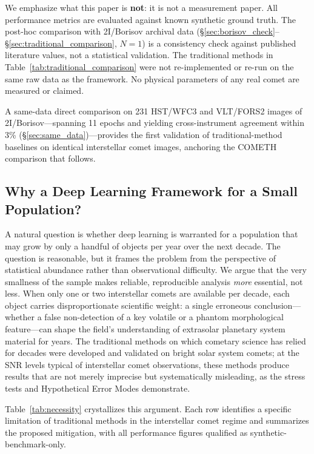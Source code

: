 \documentclass[usenatbib]{mnras}
\begin{document}
We emphasize what this paper is \textbf{not}: it is not a measurement paper. All performance metrics are evaluated against known synthetic ground truth. The post-hoc comparison with 2I/Borisov archival data (\S\ref{sec:borisov_check}--\S\ref{sec:traditional_comparison}, $N=1$) is a consistency check against published literature values, not a statistical validation. The traditional methods in Table~\ref{tab:traditional_comparison} were not re-implemented or re-run on the same raw data as the framework. No physical parameters of any real comet are measured or claimed.


 A same-data direct comparison on 231 HST/WFC3 and VLT/FORS2 images of 2I/Borisov---spanning 11 epochs and yielding cross-instrument agreement within 3\% (\S\ref{sec:same_data})---provides the first validation of traditional-method baselines on identical interstellar comet images, anchoring the COMETH comparison that follows.

\subsection{Why a Deep Learning Framework for a Small Population?}

A natural question is whether deep learning is warranted for a population that may grow by only a handful of objects per year over the next decade. The question is reasonable, but it frames the problem from the perspective of statistical abundance rather than observational difficulty. We argue that the very smallness of the sample makes reliable, reproducible analysis \textit{more} essential, not less. When only one or two interstellar comets are available per decade, each object carries disproportionate scientific weight: a single erroneous conclusion---whether a false non-detection of a key volatile or a phantom morphological feature---can shape the field's understanding of extrasolar planetary system material for years. The traditional methods on which cometary science has relied for decades were developed and validated on bright solar system comets; at the SNR levels typical of interstellar comet observations, these methods produce results that are not merely imprecise but systematically misleading, as the stress tests and Hypothetical Error Modes demonstrate.

Table~\ref{tab:necessity} crystallizes this argument. Each row identifies a specific limitation of traditional methods in the interstellar comet regime and summarizes the proposed mitigation, with all performance figures qualified as synthetic-benchmark-only.
\end{document}
